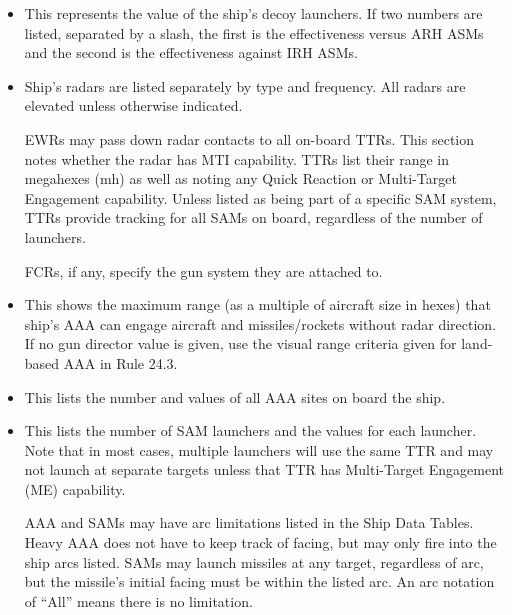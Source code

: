 \begin{itemize}
    \item {} This represents the value of the ship's decoy launchers.  If two numbers are listed, separated by a slash, the first is the effectiveness versus ARH ASMs and the second is the effectiveness against IRH ASMs.

    \item {} Ship's radars are listed separately by type and frequency. All radars are elevated unless otherwise indicated.

    EWRs may pass down radar contacts to all on-board TTRs.  This section notes whether the radar has MTI capability. TTRs list their range in megahexes (mh) as well as noting any Quick Reaction or Multi-Target Engagement capability.  Unless listed as being part of a specific SAM system, TTRs provide tracking for all SAMs on board, regardless of the number of launchers.

    FCRs, if any, specify the gun system they are attached to.

    \item {} This shows the maximum range (as a multiple of aircraft size in hexes) that ship's AAA can engage aircraft and missiles/rockets without radar direction.  If no gun director value is given, use the visual range criteria given for land-based AAA in Rule 24.3.

    \item {} This lists the number and values of all AAA sites on board the ship. 

    \item {} This lists the number of SAM launchers and the values for each launcher.  Note that in most cases, multiple launchers will use the same TTR and may not launch at separate targets unless that TTR has Multi-Target Engagement (ME) capability.

    AAA and SAMs may have arc limitations listed in the Ship Data Tables. Heavy AAA does not have to keep track of facing, but may only fire into the ship arcs listed.  SAMs may launch missiles at any target, regardless of arc, but the missile's initial facing must be within the listed arc.  An arc notation of “All” means there is no limitation.
\end{itemize}

